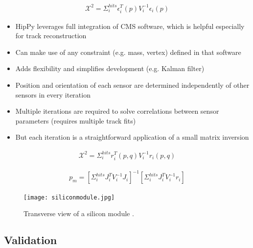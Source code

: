 \begin{equation}
\label{eq:HIPX2}
\begin{gathered}
\mathcal{X} ^2 = \Sigma_i^{hits} \epsilon_i^T(p) V^{-1}_i \epsilon_i(p)
\end{gathered}
\end{equation}

\begin{itemize}
    \item HipPy leverages full integration of CMS software, which is helpful especially for track reconstruction
    \item Can make use of any constraint (e.g. mass, vertex) defined in that software
    \item Adds flexibility and simplifies development (e.g. Kalman filter)
    \item Position and orientation of each sensor are determined independently of other sensors in every iteration
    \item Multiple iterations are required to solve correlations between sensor parameters (requires multiple track fits)
    \item But each iteration is a straightforward application of a small matrix inversion
\end{itemize}

\begin{equation}
\label{eq:HPX2}
\begin{gathered}
\mathcal{X} ^2 = \Sigma_i^{hits} r_i^T(p, q) V^{-1}_i r_i(p, q)
\end{gathered}
\end{equation}

\begin{equation}
\label{eq:HPpm}
\begin{gathered}
p_m = [\Sigma_i^{hits} J^T_i V^{-1}_i J_i]^{-1} [\Sigma_i^{hits} J^T_i V^{-1}_i r_i]
\end{gathered}
\end{equation}

\begin{figure}[!htb]
    \begin{center}
        \texttt{[image: siliconmodule.jpg]}
        \caption{Transverse view of a silicon module \cite{2022166795}.}
        \label{fig:siliconmodule}
    \end{center}
\end{figure}



\subsection{Validation}


